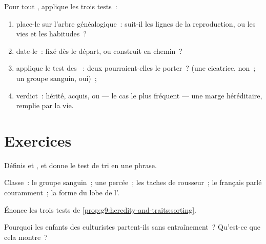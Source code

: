 \begin{method}\label{met:g9:heredity-and-traits:audit}
Pour tout , applique les trois tests~:
\begin{enumerate}
  \item place-le sur l'arbre généalogique~: suit-il les
        lignes de la reproduction, ou les vies et les
        habitudes~?
  \item date-le~: fixé dès le départ, ou construit en
        chemin~?
  \item applique le test des ~: deux 
        pourraient-elles le porter~? (une cicatrice, non~;
        un groupe sanguin, oui)~;
  \item verdict~: hérité, acquis, ou --- le cas le plus
        fréquent --- une marge héréditaire, remplie par la vie.
\end{enumerate}
\end{method}

\section{Exercices}

\begin{exercise}[$\star$]\label{exo:g9:heredity-and-traits:1}
Définis  et , et donne le test de tri en
une phrase.
\end{exercise}

\begin{exercise}[$\star$]\label{exo:g9:heredity-and-traits:2}
Classe~: le groupe sanguin~; une  percée~; les
taches de rousseur~; le français parlé couramment~; la
forme du lobe de l'.
\end{exercise}

\begin{exercise}[$\star$]\label{exo:g9:heredity-and-traits:3}
Énonce les trois tests de
\cref{prop:g9:heredity-and-traits:sorting}.
\end{exercise}

\begin{exercise}[$\star$]\label{exo:g9:heredity-and-traits:4}
Pourquoi les enfants des culturistes partent-ils sans
entraînement~? Qu'est-ce que cela montre~?
\end{exercise}

